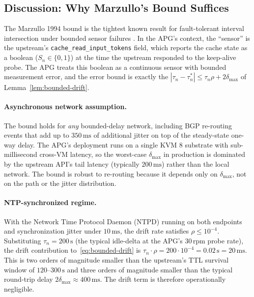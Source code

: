 \documentclass[10pt,twocolumn]{article}
\theoremstyle{definition}
\theoremstyle{remark}
\begin{document}
\subsection{Discussion: Why Marzullo's Bound Suffices}
\label{sec:clock-drift:discussion}

The Marzullo 1994 bound is the tightest known result for fault-tolerant
interval intersection under bounded sensor failures
\citep{marzullo1994}. In the APG's context, the ``sensor'' is the
upstream's \texttt{cache\_read\_input\_tokens} field, which reports the
cache state as a boolean ($S_n \in \{0, 1\}$) at the time the upstream
responded to the keep-alive probe. The APG treats this boolean as a
continuous sensor with bounded measurement error, and the error bound
is exactly the $|\tau_n - \tau_n^*| \le \tau_n \rho + 2 \delta_{\max}$
of Lemma~\ref{lem:bounded-drift}.

\paragraph{Asynchronous network assumption.}
The bound holds for \emph{any} bounded-delay network, including BGP
re-routing events that add up to $350\,\text{ms}$ of additional jitter
on top of the steady-state one-way delay. The APG's deployment runs on
a single KVM 8 substrate with sub-millisecond cross-VM latency, so the
worst-case $\delta_{\max}$ in production is dominated by the upstream
API's tail latency (typically $200\,\text{ms}$) rather than the local
network. The bound is robust to re-routing because it depends only on
$\delta_{\max}$, not on the path or the jitter distribution.

\paragraph{NTP-synchronized regime.}
With the Network Time Protocol Daemon (NTPD) running on both endpoints
and synchronization jitter under $10\,\text{ms}$, the drift rate
satisfies $\rho \le 10^{-4}$. Substituting $\tau_n = 200\,\text{s}$
(the typical idle-delta at the APG's $30\,\text{rpm}$ probe rate), the
drift contribution to~\eqref{eq:bounded-drift} is
$\tau_n \cdot \rho = 200 \cdot 10^{-4} = 0.02\,\text{s} = 20\,\text{ms}$.
This is two orders of magnitude smaller than the upstream's TTL survival
window of $120$--$300\,\text{s}$ and three orders of magnitude smaller
than the typical round-trip delay $2 \delta_{\max} \approx 400\,\text{ms}$.
The drift term is therefore operationally negligible.
\end{document}
